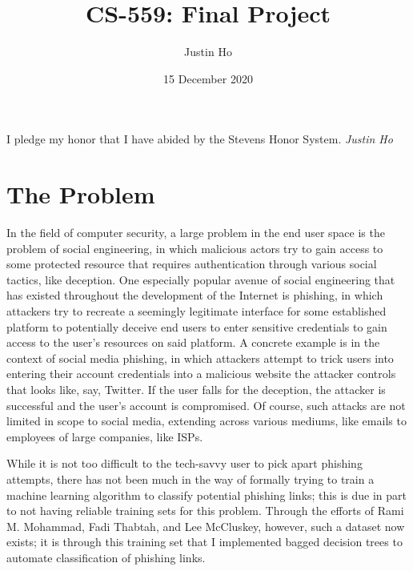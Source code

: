 \documentclass[12pt]{article}
\title{CS-559: Final Project}
\author{Justin Ho}
\date{15 December 2020}
\begin{document}
  \maketitle

  {\flushleft I pledge my honor that I have abided by the Stevens Honor System. \textit{Justin Ho}}

  \section{The Problem}
  In the field of computer security, a large problem in the end user space is the problem of social engineering, in which malicious actors try to gain access to some protected resource that requires authentication through various social tactics, like deception. One especially popular avenue of social engineering that has existed throughout the development of the Internet is phishing, in which attackers try to recreate a seemingly legitimate interface for some established platform to potentially deceive end users to enter sensitive credentials to gain access to the user's resources on said platform. A concrete example is in the context of social media phishing, in which attackers attempt to trick users into entering their account credentials into a malicious website the attacker controls that looks like, say, Twitter. If the user falls for the deception, the attacker is successful and the user's account is compromised. Of course, such attacks are not limited in scope to social media, extending across various mediums, like emails to employees of large companies, like ISPs.

  While it is not too difficult to the tech-savvy user to pick apart phishing attempts, there has not been much in the way of formally trying to train a machine learning algorithm to classify potential phishing links; this is due in part to not having reliable training sets for this problem. Through the efforts of Rami M. Mohammad, Fadi Thabtah, and Lee McCluskey, however, such a dataset now exists; it is through this training set that I implemented bagged decision trees to automate classification of phishing links.
  
\end{document}

